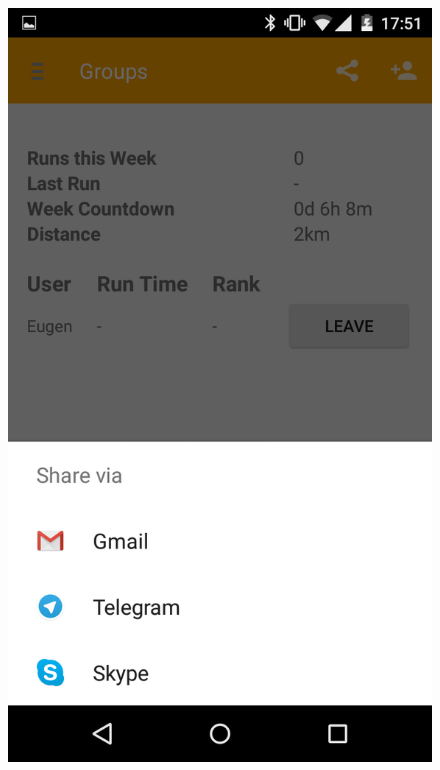 \begin{figure}[!h]
\centering
\begin{minipage}{.4\textwidth}
  \centering
  \includegraphics[width=.8\linewidth]{abb/bsp/bsp5}
  \label{fig:bsp5}
\end{minipage}
\begin{minipage}{.4\textwidth}
  \centering

\end{minipage}
\end{figure}
